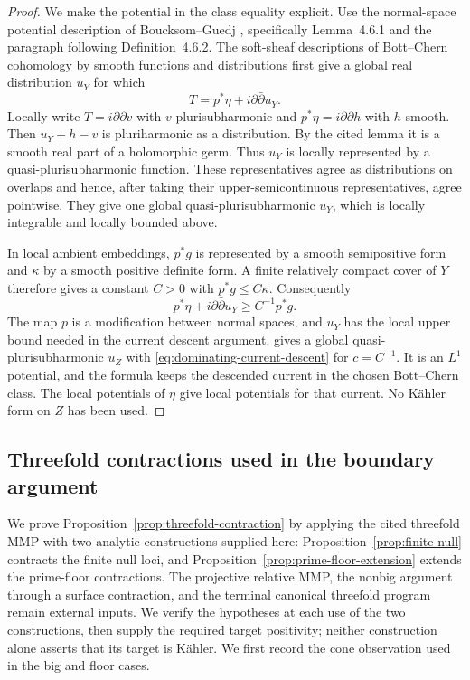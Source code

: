 \begin{proof}
We make the potential in the class equality explicit.  Use the
normal-space potential description of Boucksom--Guedj
\cite[Section~4.6.1]{BoucksomGuedj2013}, specifically Lemma~4.6.1 and
the paragraph following Definition~4.6.2.  The soft-sheaf descriptions
of Bott--Chern cohomology by smooth functions and distributions first
give a global real distribution \(u_Y\) for which
\[
 T=p^*\eta+i\partial\bar\partial u_Y.
\]
Locally write \(T=i\partial\bar\partial v\) with \(v\) plurisubharmonic
and \(p^*\eta=i\partial\bar\partial h\) with \(h\) smooth.  Then
\(u_Y+h-v\) is pluriharmonic as a distribution.  By the cited lemma
it is a smooth real part of a holomorphic germ.  Thus \(u_Y\) is locally
represented by a quasi-plurisubharmonic function.  These representatives
agree as distributions on overlaps and hence, after taking their
upper-semicontinuous representatives, agree pointwise.  They give one
global quasi-plurisubharmonic \(u_Y\), which is locally integrable and
locally bounded above.

In local ambient embeddings, \(p^*g\) is represented by a smooth
semipositive form and \(\kappa\) by a smooth positive definite form.
A finite relatively compact cover of \(Y\) therefore gives a constant
\(C>0\) with \(p^*g\leq C\kappa\).  Consequently
\[
 p^*\eta+i\partial\bar\partial u_Y\geq C^{-1}p^*g.
\]
The map \(p\) is a modification between normal spaces, and \(u_Y\)
has the local upper bound needed in the current descent argument.
\cite[Corollary~2.32 and its proof, p.~18]{DasHaconPaun2024} gives a global
quasi-plurisubharmonic \(u_Z\) with
\eqref{eq:dominating-current-descent} for \(c=C^{-1}\).  It is an
\(L^1\) potential, and the formula keeps the descended current in the
chosen Bott--Chern class.  The local potentials of \(\eta\) give local
potentials for that current.  No K\"ahler form on \(Z\) has been used.
\end{proof}

\subsection{Threefold contractions used in the boundary argument}
\label{subsec:threefold-contraction-bridge}

We prove Proposition~\ref{prop:threefold-contraction} by applying the
cited threefold MMP with two analytic constructions supplied here:
Proposition~\ref{prop:finite-null} contracts the finite null loci, and
Proposition~\ref{prop:prime-floor-extension} extends the prime-floor
contractions.  The projective relative MMP, the nonbig argument through
a surface contraction, and the terminal canonical threefold program
remain external inputs.  We verify the hypotheses at each use of the
two constructions, then supply the required target positivity; neither
construction alone asserts that its target is K\"ahler.  We first record
the cone observation used in the big and floor cases.

